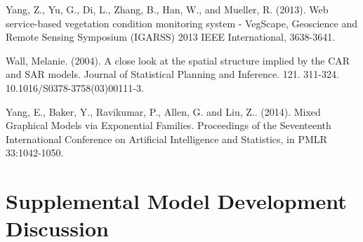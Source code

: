 \documentclass[12pt, a4paper, twoside]{article}
\begin{document}
\begin{thebibliography}{9}
	 Yang, Z., Yu, G., Di, L., Zhang, B., Han, W., and Mueller, R. (2013). Web service-based vegetation condition monitoring system - VegScape, Geoscience and Remote Sensing Symposium (IGARSS) 2013 IEEE International, 3638-3641.
	
	 Wall, Melanie. (2004). A close look at the spatial structure implied by the CAR and SAR models. Journal of Statistical Planning and Inference. 121. 311-324. 10.1016/S0378-3758(03)00111-3.
	
	 	Yang, E., Baker, Y., Ravikumar, P., Allen, G. and Liu, Z.. (2014). Mixed Graphical Models via Exponential Families. Proceedings of the Seventeenth International Conference on Artificial Intelligence and Statistics, in PMLR 33:1042-1050.
	
	
\end{thebibliography}
\newpage
\appendix
\section{Supplemental Model Development Discussion}
\end{document}
